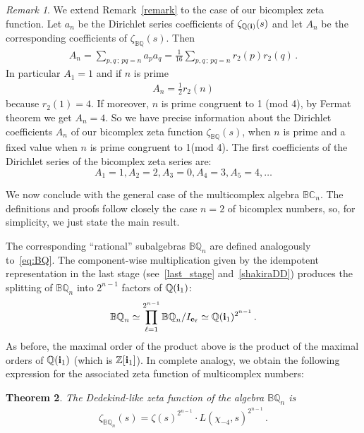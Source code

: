 \documentclass[reqno]{amsart}
\theoremstyle{plain}
\newtheorem{theorem}{Theorem}[section]
\theoremstyle{definition}
\theoremstyle{remark}
\newtheorem{remark}[theorem]{Remark}
\numberwithin{equation}{section}
\begin{document}
\begin{remark}
  We extend Remark~\ref{remark} to the case of our bicomplex zeta
  function.  Let $a_n$ be the Dirichlet series coefficients of
  $\zeta_{{{\mathbb Q}}({{\bf i}})}(s)$ and let $A_n$ be the corresponding coefficients
  of $\zeta_{{\mathbb B}{\mathbb Q}}(s)$. Then
  \begin{align*}
    A_n= \sum_{p,q\,;\,  pq=n}a_p a_q= \frac{1}{16} \sum_{p,q\,;\, pq=n}r_2(p) r_2(q)   \,.
  \end{align*}
  In particular $A_1= 1$ and if $n$ is prime
  \begin{align*}
    A_n= \frac{1}{2}r_2(n)  
  \end{align*}
  because $r_2(1)= 4$.  If moreover, $n$ is prime congruent to 1 (mod
  4), by Fermat theorem we get $A_n= 4$. So we have precise
  information about the Dirichlet coefficients $A_n$ of our bicomplex
  zeta function $\zeta_{{\mathbb B}{\mathbb Q}}(s)$, when $n$ is prime and a fixed value
  when $n$ is prime congruent to 1(mod 4).  The first coefficients of
  the Dirichlet series of the bicomplex zeta series are:
  $$
  A_1= 1, A_2=2, A_3= 0, A_4= 3, A_5= 4,\dots
  $$
\end{remark}

\bigskip

We now conclude with the general case of the multicomplex algebra
${{\mathbb B}{\mathbb C}}_n$. The definitions and proofs follow closely the case $n=2$ of
bicomplex numbers, so, for simplicity, we just state the main result.

The corresponding ``rational'' subalgebras ${{\mathbb B}{\mathbb Q}}_n$ are defined
analogously to~\eqref{eq:BQ}.  The component-wise multiplication given
by the idempotent representation in the last stage
(see~\eqref{last_stage} and~\eqref{shakiraDD}) produces the splitting
of ${{\mathbb B}{\mathbb Q}}_n$ into $2^{n-1}$ factors of ${{\mathbb Q}}({{\bf i}}_1)$:
\begin{align*}
  {{\mathbb B}{\mathbb Q}}_n  \simeq \prod_{\ell=1}^{2^{n-1}} {{\mathbb B}{\mathbb Q}}_n/I_{{{\bf e}}_\ell}
  \simeq {{\mathbb Q}}({{\bf i}}_1)^{2^{n-1}}\,.
\end{align*}
As before, the maximal order of the product above is the product of
the maximal orders of ${{\mathbb Q}}({{\bf i}}_1)$ (which is ${{\mathbb Z}}[{{\bf i}}_1]$). In complete
analogy, we obtain the following expression for the associated zeta
function of multicomplex numbers:

\begin{theorem}
  The Dedekind-like zeta function of the algebra ${{\mathbb B}{\mathbb Q}}_n$ is
  \begin{align}
    \zeta_{{{\mathbb B}{\mathbb Q}}_n}(s) = \zeta(s)^{2^{n-1}}\cdot L(\chi_{-4},s)^{2^{n-1}}\,.
  \end{align}
\end{theorem}
\end{document}
